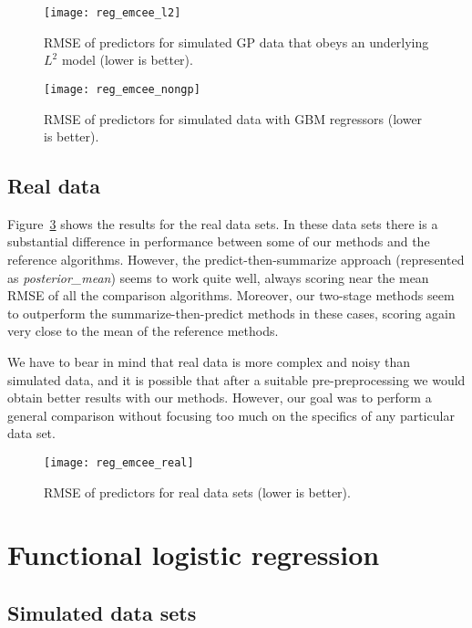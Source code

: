 \vspace{.2em}

\begin{figure}[ht!]
  \centering
  \texttt{[image: reg\_emcee\_l2]}
  \caption{RMSE of predictors for simulated GP data that obeys an underlying \(L^2\) model (lower is better).}\label{fig:reg_emcee_l2}
\end{figure}

\begin{figure}[ht!]
  \centering
  \texttt{[image: reg\_emcee\_nongp]}
  \caption{RMSE of predictors for simulated data with GBM regressors (lower is better).}\label{fig:reg_emcee_nongp}
\end{figure}

\subsection*{Real data}

Figure~\ref{fig:reg_emcee_real} shows the results for the real data sets. In these data sets there is a substantial difference in performance between some of our methods and the reference algorithms. However, the predict-then-summarize approach (represented as \textit{posterior\_mean}) seems to work quite well, always scoring near the mean RMSE of all the comparison algorithms. Moreover, our two-stage methods seem to outperform the summarize-then-predict methods in these cases, scoring again very close to the mean of the reference methods.

We have to bear in mind that real data is more complex and noisy than simulated data, and it is possible that after a suitable pre-preprocessing we would obtain better results with our methods. However, our goal was to perform a general comparison without focusing too much on the specifics of any particular data set.

\begin{figure}[ht!]
  \centering
  \texttt{[image: reg\_emcee\_real]}
  \caption{RMSE of predictors for real data sets (lower is better).}\label{fig:reg_emcee_real}
\end{figure}

\section{Functional logistic regression}\label{sec:experiments-logistic}

\subsection*{Simulated data sets}

